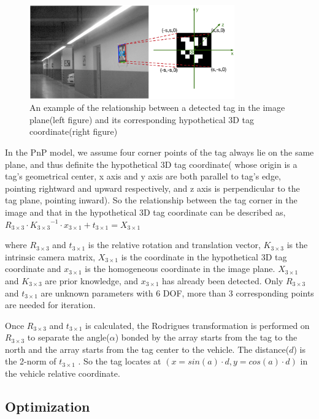 \documentclass[journal]{IEEEtran}
\begin{document}
\begin{figure}
\centering
\includegraphics[height = 1.6in]{pic/fig7_Visual_markers}
\caption{
An example of the relationship between a detected tag in the image plane(left figure) and its corresponding hypothetical 3D tag coordinate(right figure)
}\label{fig:7}
\end{figure}

In the PnP model, we assume four corner points of the tag always lie on the same plane, and thus definite the hypothetical 3D tag coordinate( whose origin is a tag’s geometrical center, x axis and y axis are both parallel to tag’s edge, pointing rightward and upward respectively, and z axis is perpendicular to the tag plane, pointing inward). 
So the relationship between the tag corner in the image and that in the hypothetical 3D tag coordinate can be described as,
${R}_{3 \times 3} \cdot {{K}_{3 \times 3}}^{-1} \cdot {x}_{3 \times 1}+{t}_{3 \times 1}={X}_{3 \times 1}$

where ${R}_{3 \times 3}$ and ${t}_{3 \times 1}$ is the relative rotation and translation vector, 
${K}_{3 \times 3}$ is the intrinsic camera matrix, 
${X}_{3 \times 1}$ is the coordinate in the hypothetical 3D tag coordinate and ${x}_{3 \times 1}$ is the homogeneous coordinate in the image plane. 
${X}_{3 \times 1}$ and ${K}_{3 \times 3}$ are prior knowledge, 
and ${x}_{3 \times 1}$ has already been detected. 
Only ${R}_{3 \times 3}$ and ${t}_{3 \times 1}$ are unknown parameters with 6 DOF, more than 3 corresponding points are needed for iteration. 

Once ${R}_{3 \times 3}$ and ${t}_{3 \times 1}$ is calculated, the Rodrigues transformation is performed on ${R}_{3 \times 3}$ to separate the angle($\alpha$) bonded by the array starts from the tag to the north and the array starts from the tag center to the vehicle. 
The distance($d$) is the 2-norm of ${t}_{3 \times 1}$ . 
So the tag locates at $( x=sin(a) \cdot d, y=cos(a) \cdot d)$ in the vehicle relative coordinate.

\subsection{Optimization}
\end{document}
